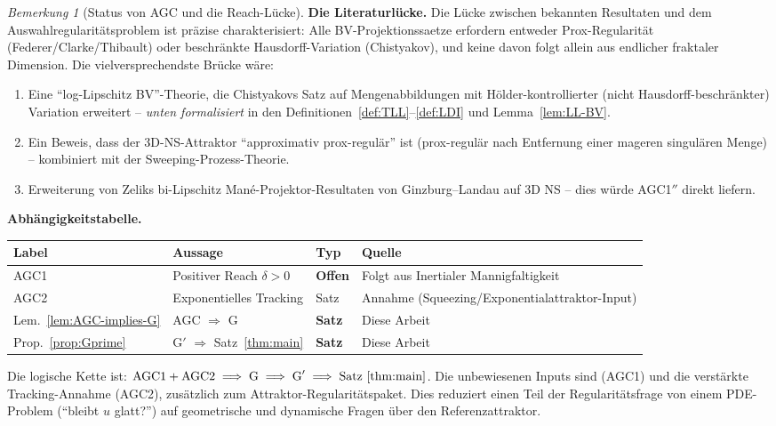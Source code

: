 \documentclass[12pt,a4paper]{article}
\theoremstyle{definition}
\theoremstyle{plain}
\theoremstyle{remark}
\newtheorem{remark}[definition]{Bemerkung}
\begin{document}
\begin{remark}[Status von AGC und die Reach-Lücke]
\noindent
\textbf{Die Literaturlücke.}\;
Die Lücke zwischen bekannten Resultaten und dem Auswahlregularitätsproblem ist
präzise charakterisiert: Alle BV-Projektionssaetze erfordern entweder
Prox-Regularität (Federer/Clarke/Thibault) oder beschränkte Hausdorff-Variation
(Chistyakov), und keine davon folgt allein aus endlicher fraktaler Dimension.
Die vielversprechendste Brücke wäre:
\begin{enumerate}
  \item Eine ``log-Lipschitz BV''-Theorie, die Chistyakovs Satz auf
    Mengenabbildungen mit H\"older-kontrollierter (nicht Hausdorff-beschränkter)
    Variation erweitert -- \emph{unten formalisiert} in
    den Definitionen~\ref{def:TLL}--\ref{def:LDI} und
    Lemma~\ref{lem:LL-BV}.
  \item Ein Beweis, dass der 3D-NS-Attraktor ``approximativ
    prox-regulär'' ist (prox-regulär nach Entfernung einer mageren singulären
    Menge) -- kombiniert mit der Sweeping-Prozess-Theorie.
  \item Erweiterung von Zeliks bi-Lipschitz Man\'e-Projektor-Resultaten
    von Ginzburg--Landau auf 3D NS -- dies würde AGC1$''$
    direkt liefern.
\end{enumerate}

\medskip\noindent
\textbf{Abhängigkeitstabelle.}
\medskip

\begin{center}
\begin{tabularx}{\textwidth}{@{}lYlY@{}}
\hline
\textbf{Label} & \textbf{Aussage} & \textbf{Typ} & \textbf{Quelle} \\
\hline
AGC1 & Positiver Reach $\delta > 0$ & \textbf{Offen} &
  Folgt aus Inertialer Mannigfaltigkeit \\
AGC2 & Exponentielles Tracking & Satz &
  Annahme (Squeezing/Exponentialattraktor-Input) \\
Lem.~\ref{lem:AGC-implies-G} & AGC $\Rightarrow$ G &
  \textbf{Satz} & Diese Arbeit \\
Prop.~\ref{prop:Gprime} & G$'$ $\Rightarrow$
  Satz~\ref{thm:main} & \textbf{Satz} & Diese Arbeit \\
\hline
\end{tabularx}
\end{center}

\medskip\noindent
Die logische Kette ist:
$\textup{AGC1} + \textup{AGC2}
\;\Longrightarrow\;
\textup{G}
\;\Longrightarrow\;
\textup{G}'
\;\Longrightarrow\;
\textup{Satz~\ref{thm:main}}$.
Die unbewiesenen Inputs sind \textup{(AGC1)} und die verstärkte
Tracking-Annahme \textup{(AGC2)}, zusätzlich zum
Attraktor-Regularitätspaket. Dies reduziert einen Teil der
Regularitätsfrage von einem PDE-Problem (``bleibt $u$ glatt?'') auf
geometrische und dynamische Fragen über den Referenzattraktor.
\end{remark}
\end{document}
